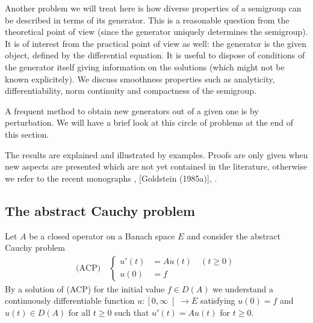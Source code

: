 Another problem we will treat here is how diverse properties of a semigroup can be described in terms of its generator.
This is a reasonable question from the theoretical point of view (since the generator uniquely determines the semigroup).
It is of interest from the practical point of view as well: the generator is the given object, defined by the differential equation.
It is useful to dispose of conditions of the generator itself giving information on the solutions (which might not be known explicitely).
We discuss smoothness properties such as analyticity, differentiability, norm continuity and compactness of the semigroup.

A frequent method to obtain new generators out of a given one is by perturbation.
We will have a brief look at this circle of problems at the end of this section.

The results are explained and illustrated by examples.
Proofs are only given when new aspects are presented which are not yet contained in the literature, otherwise we refer to the recent monographs \citet{davies:1980}, [Goldstein (1985a)], \citet{pazy:1983}.
\subsection{The abstract Cauchy problem} \label{subsec:a2-1.se1}
Let $A$ be a closed operator on a Banach space $E$ and consider the abstract Cauchy problem
\begin{align*}
\text{(ACP)} \quad \begin{cases}
    u'(t) &= Au(t) \quad (t \geq 0) \\
    u(0) &= f
\end{cases}
\end{align*}
By a solution of (ACP) for the initial value $f \in D(A)$ we understand a continuously differentiable function $u \colon \left[0,\infty\right[ \to E$ satisfying $u(0) = f$ and $u(t) \in D(A)$ for all $t \geq 0$ such that $u'(t) = Au(t)$ for $t \geq 0$.

